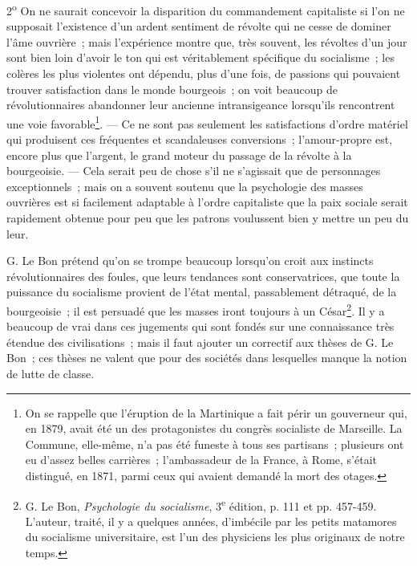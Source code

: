 \documentclass[french,twoside]{book} %
\begin{document}
2\textsuperscript{o} On ne saurait concevoir la disparition du commandement capitaliste si l’on ne supposait l’existence d’un  ardent sentiment de révolte qui ne cesse de dominer l’âme ouvrière ; mais l’expérience montre que, très souvent, les révoltes d’un jour sont bien loin d’avoir le ton qui est véritablement spécifique du socialisme ; les colères les plus violentes ont dépendu, plus d’une fois, de passions qui pouvaient trouver satisfaction dans le monde bourgeois ; on voit beaucoup de révolutionnaires abandonner leur ancienne intransigeance lorsqu’ils rencontrent une voie favorable\footnote{ \noindent On se rappelle que l’éruption de la Martinique a fait périr un gouverneur qui, en 1879, avait été un des protagonistes du congrès socialiste de Marseille. La Commune, elle-même, n’a pas été funeste à tous ses partisans ; plusieurs ont eu d’assez belles carrières ; l’ambassadeur de la France, à Rome, s’était distingué, en 1871, parmi ceux qui avaient demandé la mort des otages.
 }. — Ce ne sont pas seulement les satisfactions d’ordre matériel qui produisent ces fréquentes et scandaleuses conversions ; l’amour-propre est, encore plus que l’argent, le grand moteur du passage de la révolte à la bourgeoisie. — Cela serait peu de chose s’il ne s’agissait que de personnages exceptionnels ; mais on a souvent soutenu que la psychologie des masses ouvrières est si facilement adaptable à l’ordre capitaliste que la paix sociale serait rapidement obtenue pour peu que les patrons voulussent bien y mettre un peu du leur.\par
G. Le Bon prétend qu’on se trompe beaucoup lorsqu’on croit aux instincts révolutionnaires des foules, que leurs tendances sont conservatrices, que toute la puissance du socialisme provient de l’état mental, passablement détraqué, de la bourgeoisie ; il est persuadé que  les masses iront toujours à un César\footnote{ \noindent G. Le Bon, \emph{Psychologie du socialisme}, 3\textsuperscript{e} édition, p. 111 et pp. 457-459. L’auteur, traité, il y a quelques années, d’imbécile par les petits matamores du socialisme universitaire, est l’un des physiciens les plus originaux de notre temps.
 }. Il y a beaucoup de vrai dans ces jugements qui sont fondés sur une connaissance très étendue des civilisations ; mais il faut ajouter un correctif aux thèses de G. Le Bon ; ces thèses ne valent que pour des sociétés dans lesquelles manque la notion de lutte de classe.\par
\end{document}
